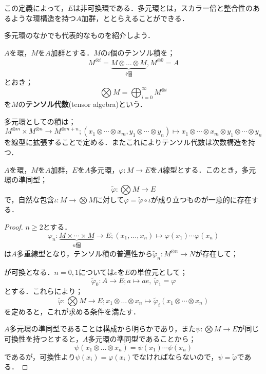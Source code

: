 この定義によって，$E$は非可換環である．多元環とは，スカラー倍と整合性のあるような環構造を持つ$A$加群，ととらえることができる．

多元環のなかでも代表的なものを紹介しよう．
\begin{defi}[テンソル代数]
	$A$を環，$M$を$A$加群とする．$M$の$i$個のテンソル積を；
	\[M^{\otimes i}=\underbrace{M\otimes\dots\otimes M}_{i\text{個}}, M^{\otimes 0}=A\]
	とおき；
	\[\bigotimes M=\bigoplus_{i=0}^\infty M^{\otimes i}\]
	を$M$の\textbf{テンソル代数}(tensor algebra)という．
\end{defi}
多元環としての積は；
\[M^{\otimes m}\times M^{\otimes n}\to M^{\otimes m+n};(x_1\otimes\cdots\otimes x_m,y_1\otimes\cdots\otimes y_n)\mapsto x_1\otimes\cdots\otimes x_m\otimes y_1\otimes\cdots\otimes y_n\]
を線型に拡張することで定める．またこれによりテンソル代数は次数構造を持つ．

\begin{prop}[テンソル代数の普遍性]
	$A$を環，$M$を$A$加群，$E$を$A$多元環，$\varphi:M\to E$を$A$線型とする．このとき，多元環の準同型；
	\[\widetilde{\varphi}:\bigotimes M\to E\]
	で，自然な包含$\iota:M\to\bigotimes M$に対して$\varphi=\widetilde{\varphi}\circ\iota$が成り立つものが一意的に存在する．
\end{prop}

\begin{proof}
	$n\geq 2$とする．
	\[\varphi_n:\underbrace{M\times\cdots\times M}_{n\text{個}}\to E;(x_1,\dots,x_n)\mapsto \varphi(x_1)\cdots\varphi(x_n)\]
	は$A$多重線型となり，テンソル積の普遍性から$\widetilde\varphi_n:M^{\otimes n}\to N$が存在して；
	\begin{figure}[H]
		\centering
		\caption{}
	\end{figure}
	が可換となる．$n=0,1$については$e$を$E$の単位元として；
	\[\widetilde\varphi_0:A\to E;a\mapsto ae,~\widetilde\varphi_1=\varphi\]
	とする．これらにより；
	\[\widetilde\varphi:\bigotimes M\to E;x_1\otimes\dots\otimes x_n\mapsto\widetilde\varphi_i(x_1\otimes\cdots\otimes x_n)\]
	を定めると，これが求める条件を満たす．
	
	$A$多元環の準同型であることは構成から明らかであり，また$\psi:\bigotimes M\to E$が同じ可換性を持つとすると，$A$多元環の準同型であることから；
	\[\psi(x_1\otimes\dots\otimes x_n)=\psi(x_1)\cdots\psi(x_n)\]
	であるが，可換性より$\psi(x_i)=\varphi(x_i)$でなければならないので，$\psi=\widetilde\varphi$である．
\end{proof}

